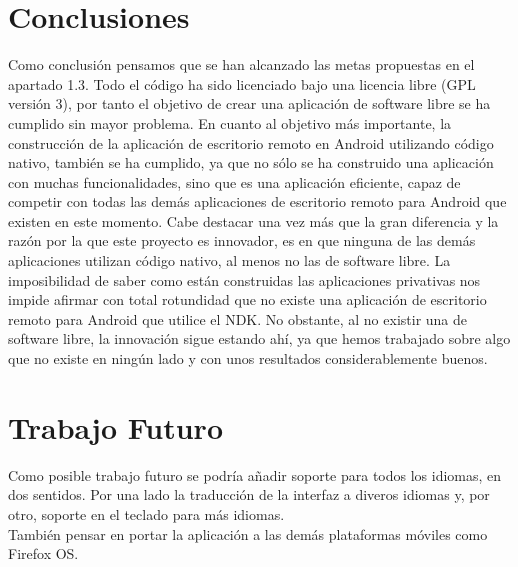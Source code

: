 \section{Conclusiones}
Como conclusión pensamos que se han alcanzado las metas propuestas en el apartado 1.3. Todo el código ha sido licenciado bajo una licencia libre (GPL versión 3), por tanto el objetivo de crear una aplicación de software libre se ha cumplido sin mayor problema. En cuanto al objetivo más importante, la construcción de la aplicación de escritorio remoto en Android utilizando código nativo, también se ha cumplido, ya que no sólo se ha construido una aplicación con muchas funcionalidades, sino que es una aplicación eficiente, capaz de competir con todas las demás aplicaciones de escritorio remoto para Android que existen en este momento. Cabe destacar una vez más que la gran diferencia y la razón por la que este proyecto es innovador, es en que ninguna de las demás aplicaciones utilizan código nativo, al menos no las de software libre. La imposibilidad de saber como están construidas las aplicaciones privativas nos impide afirmar con total rotundidad que no existe una aplicación de escritorio remoto para Android que utilice el NDK. No obstante, al no existir una de software libre, la innovación sigue estando ahí, ya que hemos trabajado sobre algo que no existe en ningún lado y con unos resultados considerablemente buenos.

\section{Trabajo Futuro}

Como posible trabajo futuro se podría añadir soporte para todos los idiomas, en dos sentidos. Por una lado la traducción de la interfaz a diveros idiomas y, por otro, soporte en el teclado para más idiomas.\\

También pensar en portar la aplicación a las demás plataformas móviles como Firefox OS. 
